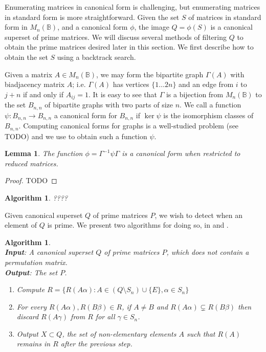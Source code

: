 \documentclass[11pt]{article}
\newtheorem{lemma}[thm]{Lemma}
\newtheorem{algo}[thm]{Algorithm}
\newenvironment{alg}{\begin{algo}\rm}{\end{algo}}
\numberwithin{equation}{section}
\newcommand{\set}[2]{\ensuremath{\{#1 : #2 \}}}
\renewcommand{\to}{\longrightarrow}
\newcommand{\B}{\mathbb{B}}
\newcommand{\Bn}{M_n(\B)}
\newcommand{\BGSet}{B_{n,n}}
\begin{document}
Enumerating matrices in canonical form is challenging, but enumerating matrices
in standard form is more straightforward. Given the set $S$ of matrices in
standard form in $\Bn$, and a canonical form $\phi$, the image $Q = \phi(S)$ is
a canonical superset of prime matrices. We will discuss several methods
of filtering $Q$ to obtain the prime matrices desired later in this section. We
first describe how to obtain the set $S$ using a backtrack search.

Given a matrix $A \in \Bn$, we may form the bipartite graph $\Gamma(A)$ with
biadjacency matrix $A$; i.e. $\Gamma(A)$ has vertices $\{1 \ldots 2n\}$ and an
edge from $i$ to $j+n$ if and only if $A_{ij} = 1$. It is easy to see that
$\Gamma$ is a bijection from $\Bn$ to the set $\BGSet$ of bipartite graphs with
two parts of size $n$. We call a function $\psi: \BGSet \to \BGSet$ a canonical
form for $\BGSet$ if $\ker\psi$ is the isomorphism classes of $\BGSet$.
Computing canonical forms for graphs is a well-studied problem (see TODO) and we
use \cite{TODO:bliss} to obtain such a function $\psi$. 
\begin{lemma}
  The function $\phi = \Gamma^{-1}\psi\Gamma$ is a canonical form when
  restricted to reduced matrices. 
\end{lemma}
\begin{proof}
  TODO
\end{proof}
\begin{alg}
  ????
\end{alg}

Given canonical superset $Q$ of prime matrices $P$, we wish to detect
when an element of $Q$ is prime. We present two algorithms for doing so, in
 and .

\begin{alg}
  \ \\
  \textbf{Input}: A canonical superset $Q$ of prime matrices $P$, which does not
  contain a permutation matrix.\\
  \textbf{Output}: The set $P$.
  \begin{enumerate}
  \item 
    Compute $R = \set{R(A\alpha)}{A \in (Q\setminus S_n) \cup \{E\}, \alpha \in S_n}$
  \item
    For every $R(A\alpha), R(B\beta) \in R$, if $A \neq B$ and $R(A\alpha)
    \subsetneq R(B\beta)$ then discard $R(A\gamma)$ from $R$ for all $\gamma \in
    S_n$.
  \item
    Output $X\subset Q$, the set of non-elementary elements $A$ such that $R(A)$
    remains in $R$ after the previous step.
  \end{enumerate}
\end{alg}
\end{document}

